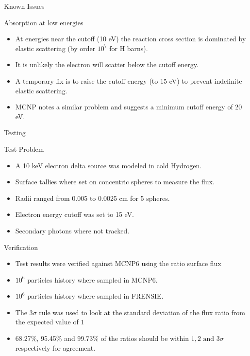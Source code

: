 \documentclass{beamer}
\begin{document}
\begin{frame}{Known Issues}
  \begin{block}{Absorption at low energies}
  \begin{itemize}
    \item At energies near the cutoff (10 eV) the reaction cross section is dominated by elastic scattering (by order $10^7$ for H barns).
    \item It is unlikely the electron will scatter below the cutoff energy.
    \item A temporary fix is to raise the cutoff energy (to 15 eV) to prevent indefinite elastic scattering.
    \item MCNP notes a similar problem and suggests a minimum cutoff energy of 20 eV.
  \end{itemize}
\end{block}

\end{frame}

\begin{frame}{Testing}
  \begin{block}{Test Problem}
  \begin{itemize}
    \item A 10 keV electron delta source was modeled in cold Hydrogen.
    \item Surface tallies where set on concentric spheres to measure the flux.
    \item Radii ranged from 0.005 to 0.0025 cm for 5 spheres.
    \item Electron energy cutoff was set to 15 eV.
    \item Secondary photons where not tracked.
  \end{itemize}
\end{block}

  \begin{block}{Verification}
  \begin{itemize}
    \item Test results were verified against MCNP6 using the ratio surface flux
    \item $10^6$ particles history where sampled in MCNP6.
    \item $10^6$ particles history where sampled in FRENSIE.
    \item The $3\sigma$ rule was used to look at the standard deviation of the flux ratio from the expected value of $1$
    \item 68.27\%, 95.45\% and 99.73\% of the ratios should be within $1, 2 \text{ and } 3 \sigma$ respectively for agreement.
  \end{itemize}
\end{block}

\end{frame}
\end{document}
